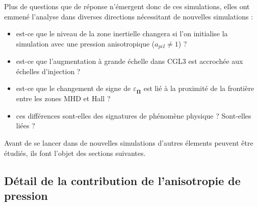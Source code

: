 Plus de questions que de réponse n'émergent donc de ces simulations, elles ont emmené l'analyse dans diverses directions nécessitant de nouvelles simulations : 
\begin{itemize}
    \item est-ce que le niveau de la zone inertielle changera si l'on initialise la simulation avec une pression anisotropique ($a_{piI} \neq 1$) ? 
    \item est-ce que l'augmentation à grande échelle dans CGL3 est accrochée aux échelles d'injection ?
   \item est-ce que le changement de signe de  $\varepsilon_{\overline{\boldsymbol{\Pi}}}$ est lié à la proximité de la frontière entre les zones \acs{MHD} et \acs{Hall} ?
    \item ces différences sont-elles des signatures de phénomène physique ? Sont-elles liées ?
\end{itemize}
Avant de se lancer dans de nouvelles simulations d'autres élements peuvent être étudiés, ils font l'objet des sections suivantes.  

\subsection{Détail de la contribution de l'anisotropie de pression}

